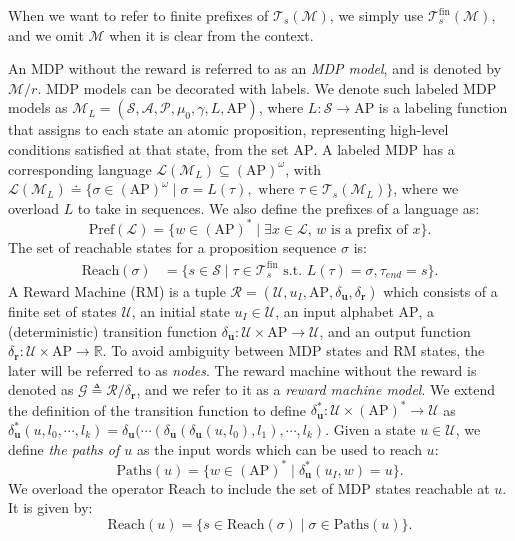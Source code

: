 \documentclass[letterpaper, 10 pt, conference]{ieeeconf}
\begin{document}
When we want to refer to finite prefixes of $\mathcal{T}_s(\mathcal{M})$, we simply use $\mathcal{T}_s^{\mathrm{fin}}(\mathcal{M})$, and we omit $\mathcal{M}$ when it is clear from the context.

An MDP without the reward is referred to as an \emph{MDP model}, and is denoted by $\mathcal{M}/r$. MDP models can be decorated with labels. We denote such labeled MDP models as $\mathcal{M}_L = (\mathcal{S},\mathcal{A}, \mathcal{P},\mu_0, \gamma, L, \mathrm{AP})$, where $L:\mathcal{S}\to \mathrm{AP}$ is a labeling function that assigns to each state an atomic proposition, representing high-level conditions satisfied at that state, from the set $\mathrm{AP}$. A labeled MDP has a corresponding language $\mathcal{L}(\mathcal{M}_L)\subseteq (\mathrm{AP})^\omega$, with $\mathcal{L}(\mathcal{M}_L) \doteq \{\sigma \in (\mathrm{AP})^\omega \mid \sigma = L(\tau), \text{ where } \tau  \in \mathcal{T}_s(\mathcal{M}_L)\}$, where we overload $L$ to take in sequences. We also define the prefixes of a language as:
\begin{equation}
\mathrm{Pref}(\mathcal{L}) = \{ w \in (\mathrm{AP})^* \mid \exists x \in \mathcal{L}, \, w \text{ is a prefix of } x \}.
\end{equation}
The set of reachable states for a proposition sequence $\sigma$ is:
\begin{align*}
    \mathrm{Reach}(\sigma) &= \{ s \in \mathcal{S} \mid  \tau \in \mathcal{T}_s^{\mathrm{fin}} \text{ s.t. } L(\tau) = \sigma, \tau_{end}=s  \}. 
\end{align*}
A Reward Machine (RM) is a tuple $\mathcal{R}=(\mathcal{U}, u_I, \mathrm{AP}, \delta_{\mathbf{u}}, \delta_{\mathbf{r}})$ which consists of a finite set of states $\mathcal{U}$, an initial state $u_I \in \mathcal{U}$, an input alphabet $\mathrm{AP}$, a (deterministic) transition function $\delta_{\mathbf{u}}: \mathcal{U} \times \mathrm{AP}\to \mathcal{U}$, and an output function $\delta_{\mathbf{r}}: \mathcal{U}\times \mathrm{AP} \to \mathbb{R}$. To avoid ambiguity between MDP states and RM states, the later will be referred to as \emph{nodes}. The reward machine without the reward is denoted as $\mathcal{G} \triangleq \mathcal{R}/\delta_\mathbf{r}$, and we refer to it as a \emph{reward machine model}. We extend the definition of the transition function to define $\delta_{\mathbf{u}}^*: \mathcal{U} \times (\mathrm{AP})^* \to \mathcal{U}$ as $\delta_{\mathbf{u}}^*(u, l_0 , \cdots, l_k) = \delta_{\mathbf{u}}(\cdots(\delta_{\mathbf{u}}(\delta_{\mathbf{u}}(u, l_0),l_1), \cdots, l_k)$.  Given a state \( u \in \mathcal{U} \), we define \emph{the paths of \( u \)} as the input words which can be used to reach \( u \):
$$
\mathrm{Paths}(u) = \{w \in (\mathrm{AP})^* \mid \delta_{\mathbf{u}}^*(u_I, w) = u\}.
$$
We overload the operator $\mathrm{Reach}$ to include the set of MDP states reachable at $u$. It is given by:
\begin{equation*}
     \mathrm{Reach}(u) = \{s\in \mathrm{Reach}(\sigma) \mid \sigma \in \mathrm{Paths}(u)\}.
\end{equation*}
\end{document}

